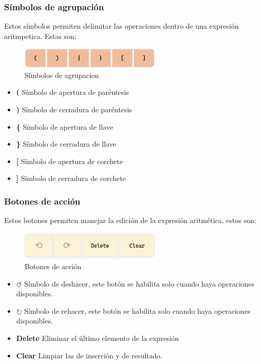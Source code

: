\documentclass[a4paper,12pt]{article}
\begin{document}
\subsubsection{Símbolos de agrupación}
Estos símbolos permiten delimitar las operaciones dentro de una expresión aritmpetica. Estas son: 

\begin{figure}[h!]
    \centering
    \includegraphics[width=0.6\textwidth]{../img/agrupacion.png}
    \caption{Símbolos de agrupacion}
    \label{fig: agru}
\end{figure}
\begin{itemize}
    \item \textbf{(} Símbolo de apertura de paréntesis
    \item \textbf{)} Símbolo de cerradura de paréntesis
    \item \textbf{\{} Símbolo de apertura de llave 
    \item \textbf{\}} Símbolo de cerradura de llave
    \item \textbf{[} Símbolo de apertura de corchete
    \item \textbf{]} Símbolo de cerradura de corchete
\end{itemize}
\subsubsection{Botones de acción}
Estos botones permiten manejar la edición de la expresión aritmética, estos son:
\begin{figure}[h!]
    \centering
    \includegraphics[width=0.6\textwidth]{../img/acciones.png}
    \caption{Botones de acción}
    \label{fig: accioens}
\end{figure}
\begin{itemize}
    \item \textbf{$\circlearrowleft$} Símbolo de deshacer, este botón se habilita solo cuando haya operaciones disponibles.
    \item \textbf{$\circlearrowright$} Símbolo de rehacer, este botón se habilita solo cuando haya operaciones disponibles.
    \item \textbf{Delete} Eliminar el último elemento de la expresión
    \item \textbf{Clear} Limpiar las de inserción y de resultado.
\end{itemize}
\end{document}
